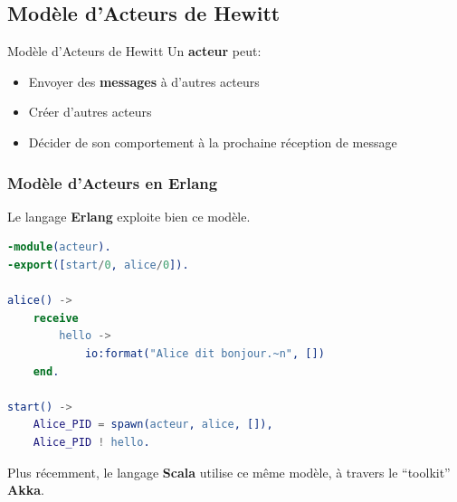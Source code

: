 \documentclass{beamer}
\begin{document}
\subsection{Modèle d'Acteurs de Hewitt}
\begin{frame}{Modèle d'Acteurs de Hewitt}
  Un \textbf{acteur} peut:
  \begin{itemize}
  \item Envoyer des \textbf{messages} à d'autres acteurs
  \item Créer d'autres acteurs
  \item Décider de son comportement à la prochaine réception de message
  \end{itemize}
\end{frame} %
\begin{frame}[containsverbatim]
  \frametitle{Modèle d'Acteurs en Erlang}
  Le langage \textbf{Erlang} exploite bien ce modèle.
  \begin{center}
\begin{lstlisting}[language=erlang]
-module(acteur).
-export([start/0, alice/0]).

alice() ->
    receive
        hello ->
            io:format("Alice dit bonjour.~n", [])
    end.

start() ->
    Alice_PID = spawn(acteur, alice, []),
    Alice_PID ! hello.
\end{lstlisting}
\end{center}
  Plus récemment, le langage \textbf{Scala} utilise ce même modèle, à travers le
  ``toolkit'' \textbf{Akka}.
\end{frame} %
\end{document}
